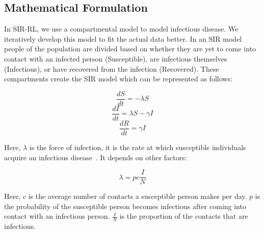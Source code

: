 \documentclass[tikz,fleqn,12pt]{wlscirep}
\begin{document}
\subsection*{Mathematical Formulation}
In SIR-RL, we use a compartmental model to model infectious disease. We iteratively develop this model to fit the actual data better. In an SIR model people of the population are divided based on whether they are yet to come into contact with an infected person (Susceptible), are infectious themselves (Infectious), or have recovered from the infection (Recovered). These compartments create the SIR model which can be represented as follows:

\begin{figure}[H]
\centering    
{}
\end{figure}
\begin{equation}
  \frac{d S}{d t}=-\lambda S
  \label{eq:S_without_lockdown}
\end{equation}
\begin{equation}
  \frac{d I}{d t}=\lambda S-\gamma I
  \label{eq:I_without_lockdown}
\end{equation}
\begin{equation}
  \frac{d R}{d t}=\gamma I
  \label{eq:R_without_lockdown}
\end{equation}

Here, $\lambda$ is the force of infection, it is the rate at which susceptible individuals acquire an infectious disease~\cite{hens_aerts_faes_shkedy_lejeune_vandamme_beutels_2010}. It depends on other factors:

\begin{equation}
  \lambda = pc\frac{I}{N}
  \label{eq:lambda_force_of_infection}
\end{equation}

Here, 
$c$ is the average number of contacts a susceptible person makes per day.
$p$ is the probability of the susceptible person becomes infectious after coming into contact with an infectious person.
$\frac{I}{N}$ is the proportion of the contacts that are infectious.
\end{document}
